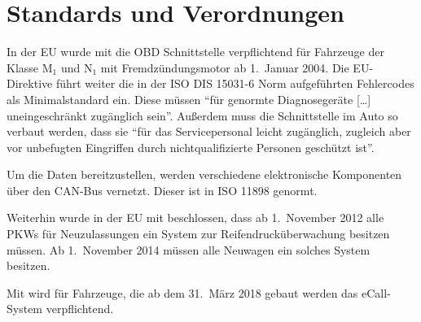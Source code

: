 \section{Standards und Verordnungen}
In der EU wurde mit \cite{EUDirective98/69/EC} die OBD Schnittstelle
verpflichtend für Fahrzeuge der Klasse M$_1$ und N$_1$ mit Fremdzündungsmotor
ab 1.~Januar 2004. Die EU-Direktive führt weiter die in der ISO DIS 15031-6
Norm aufgeführten Fehlercodes als Minimalstandard ein. Diese müssen
\enquote{für genormte Diagnosegeräte [\dots] uneingeschränkt zugänglich sein}.
Außerdem muss die Schnittstelle im Auto so verbaut werden, dass sie
\enquote{für das Servicepersonal leicht zugänglich, zugleich aber vor
unbefugten Eingriffen durch nichtqualifizierte Personen geschützt ist}.

Um die Daten bereitzustellen, werden verschiedene elektronische Komponenten
über den CAN-Bus vernetzt. Dieser ist in ISO 11898 genormt.

Weiterhin wurde in der EU mit \cite{EURegulation661/2009} beschlossen, dass ab
1.~November 2012 alle PKWs für Neuzulassungen ein System zur
Reifendrucküberwachung besitzen müssen. Ab 1.~November 2014 müssen alle
Neuwagen ein solches System besitzen.

Mit \cite{EURegulation2015/ecall} wird für Fahrzeuge, die ab dem 31.~März 2018
gebaut werden das eCall-System verpflichtend.
